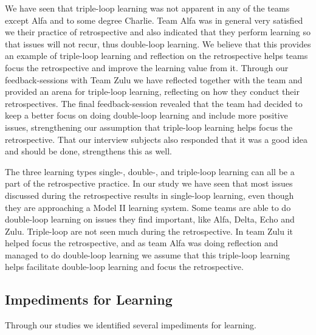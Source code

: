 We have seen that triple-loop learning was not apparent in any of the teams except Alfa and to some degree Charlie. Team Alfa was in general very satisfied we their practice of retrospective and also indicated that they perform learning so that issues will not recur, thus double-loop learning. We believe that this provides an example of triple-loop learning and reflection on the retrospective helps teams focus the retrospective and improve the learning value from it. Through our feedback-sessions with Team Zulu we have reflected together with the team and provided an arena for triple-loop learning, reflecting on how they conduct their retrospectives. The final feedback-session revealed that the team had decided to keep a better focus on doing double-loop learning and include more positive issues, strengthening our assumption that triple-loop learning helps focus the retrospective. That our interview subjects also responded that it was a good idea and should be done, strengthens this as well.

The three learning types single-, double-, and triple-loop learning can all be a part of the retrospective practice. In our study we have seen that most issues discussed during the retrospective results in single-loop learning, even though they are approaching a Model II learning system. Some teams are able to do double-loop learning on issues they find important, like Alfa, Delta, Echo and Zulu. Triple-loop are not seen much during the retrospective. In team Zulu it helped focus the retrospective, and as team Alfa was doing reflection and managed to do double-loop learning we assume that this triple-loop learning helps facilitate double-loop learning and focus the retrospective.

\subsection{Impediments for Learning}
\label{discussion:learning-impediments}
Through our studies we identified several impediments for learning. 

